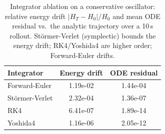 \begin{table}[t]
  \centering
  \caption{Integrator ablation on a conservative oscillator: relative energy drift $|H_T-H_0|/H_0$ and mean ODE residual vs.\ the analytic trajectory over a 10\,s rollout. St\"ormer-Verlet (symplectic) bounds the energy drift; RK4/Yoshida4 are higher order; Forward-Euler drifts.}
  \label{tab:integrators}
  \begin{tabular}{lcc}
    \toprule
    Integrator & Energy drift & ODE residual \\
    \midrule
    Forward-Euler & 1.19e-02 & 1.44e-04 \\
    St\"ormer-Verlet & 2.32e-04 & 1.36e-07 \\
    RK4 & 6.41e-07 & 1.89e-14 \\
    Yoshida4 & 1.16e-06 & 2.05e-12 \\
    \bottomrule
  \end{tabular}
\end{table}
